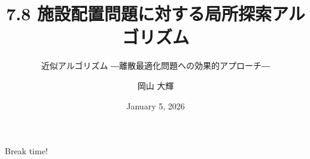 \documentclass[aspectratio=169]{beamer}
\title{7.8 施設配置問題に対する局所探索アルゴリズム}
\subtitle{近似アルゴリズム ―離散最適化問題への効果的アプローチ―}
\author{岡山 大輝}
\institute{兵庫県立大学大学院 情報科学研究科\textit{(ad25r010@guh.u-hyogo.ac.jp)}}
\date{{January 5, 2026}}
\newcommand*{\localopt}{(S, \sigma)}
\newcommand{\OPT}{\text{\upshape OPT}\xspace}
\newcommand{\FacilitySet}{\mathcal{F}}
\newcommand{\DemandSet}{\mathcal{D}}
\begin{document}
\begin{frame}
	\titlepage
\end{frame}



\begin{frame}[standout]
	Break time!
\end{frame}









\end{document}
